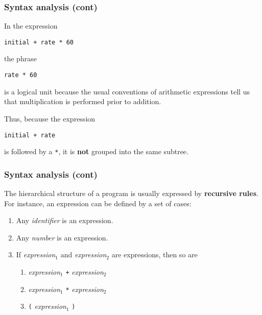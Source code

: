 % 
\begin{frame}[containsverbatim]
\frametitle{Syntax analysis (cont)}

In the expression 
\begin{verbatim}
initial + rate * 60
\end{verbatim} 
the phrase
\begin{verbatim}
rate * 60
\end{verbatim} 
is a logical unit because the usual conventions of arithmetic
 expressions tell us that multiplication is performed prior to
 addition.

\bigskip

Thus, because the expression 
\begin{verbatim}
initial + rate
\end{verbatim}
is followed by a \verb+*+, it is \textbf{not} grouped into the same
subtree.

\end{frame}

% 
\begin{frame}[containsverbatim]
\frametitle{Syntax analysis (cont)}

The hierarchical structure of a program is usually expressed by
\textbf{recursive rules}. For instance, an expression can be defined
by a set of cases:
\begin{enumerate}

  \item Any \emph{identifier} is an expression.\label{rule_id_is_expr}

  \item Any \emph{number} is an expression.\label{rule_num_is_expr}

  \item If \emph{expression}\(_1\) and \emph{expression}\(_2\) are
  expressions, then so are
   \begin{enumerate}
 
     \item \emph{expression}\(_1\) \verb|+|
       \emph{expression}\(_2\) \label{rule_add_is_expr}

     \item \emph{expression}\(_1\) \verb|*|
       \emph{expression}\(_2\) \label{rule_mult_is_expr}

     \item \verb|(| \emph{expression}\(_1\)
       \verb|)| \label{rule_paren_is_expr} 

   \end{enumerate}

\end{enumerate}

\end{frame}

